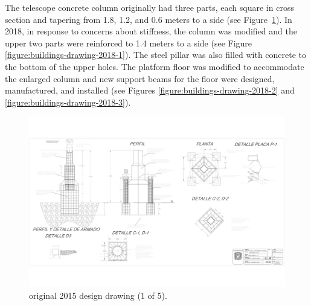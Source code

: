 The telescope concrete column originally had three parts, each square in cross section and tapering from 1.8, 1.2, and 0.6 meters to a side (see Figure~\ref{figure:buildings-drawing-2015-1}). In 2018, in response to concerns about stiffness, the column was modified and the upper two parts were reinforced to 1.4 meters to a side (see Figure \ref{figure:buildings-drawing-2018-1}). The steel pillar was also filled with concrete to the bottom of the upper holes. The platform floor was modified to accommodate the enlarged column and new support beams for the floor were designed, manufactured, and installed (see Figures \ref{figure:buildings-drawing-2018-2} and \ref{figure:buildings-drawing-2018-3}).

\begin{figure}
\begin{center}
\includegraphics[height=0.95\linewidth,angle=90]{figures/buildings-coatli-drawing-2015-1.pdf}
\end{center}
\caption{{\projectname} original 2015 design drawing (1 of 5).}
\label{figure:buildings-drawing-2015-1}
\end{figure}


